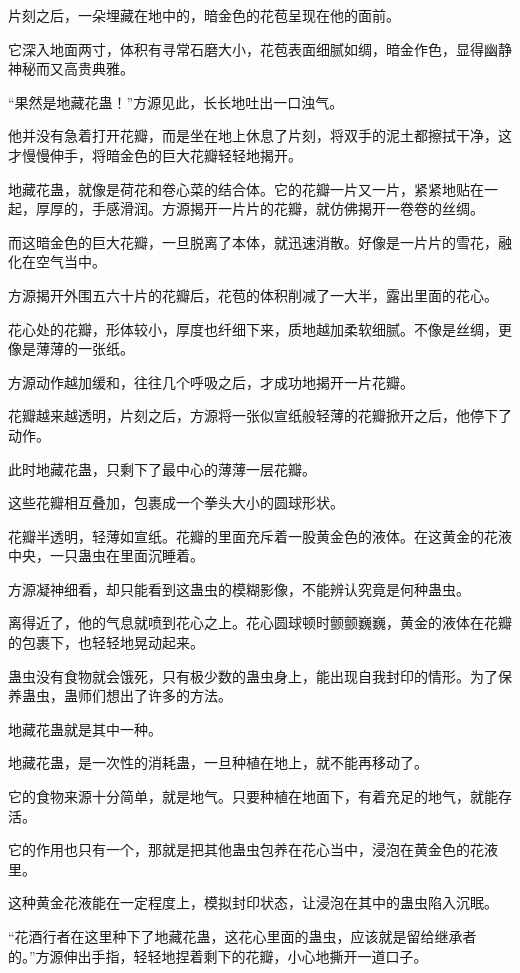 \begin{this_body}
片刻之后，一朵埋藏在地中的，暗金色的花苞呈现在他的面前。

它深入地面两寸，体积有寻常石磨大小，花苞表面细腻如绸，暗金作色，显得幽静神秘而又高贵典雅。

“果然是地藏花蛊！”方源见此，长长地吐出一口浊气。

他并没有急着打开花瓣，而是坐在地上休息了片刻，将双手的泥土都擦拭干净，这才慢慢伸手，将暗金色的巨大花瓣轻轻地揭开。

地藏花蛊，就像是荷花和卷心菜的结合体。它的花瓣一片又一片，紧紧地贴在一起，厚厚的，手感滑润。方源揭开一片片的花瓣，就仿佛揭开一卷卷的丝绸。

而这暗金色的巨大花瓣，一旦脱离了本体，就迅速消散。好像是一片片的雪花，融化在空气当中。

方源揭开外围五六十片的花瓣后，花苞的体积削减了一大半，露出里面的花心。

花心处的花瓣，形体较小，厚度也纤细下来，质地越加柔软细腻。不像是丝绸，更像是薄薄的一张纸。

方源动作越加缓和，往往几个呼吸之后，才成功地揭开一片花瓣。

花瓣越来越透明，片刻之后，方源将一张似宣纸般轻薄的花瓣掀开之后，他停下了动作。

此时地藏花蛊，只剩下了最中心的薄薄一层花瓣。

这些花瓣相互叠加，包裹成一个拳头大小的圆球形状。

花瓣半透明，轻薄如宣纸。花瓣的里面充斥着一股黄金色的液体。在这黄金的花液中央，一只蛊虫在里面沉睡着。

方源凝神细看，却只能看到这蛊虫的模糊影像，不能辨认究竟是何种蛊虫。

离得近了，他的气息就喷到花心之上。花心圆球顿时颤颤巍巍，黄金的液体在花瓣的包裹下，也轻轻地晃动起来。

蛊虫没有食物就会饿死，只有极少数的蛊虫身上，能出现自我封印的情形。为了保养蛊虫，蛊师们想出了许多的方法。

地藏花蛊就是其中一种。

地藏花蛊，是一次性的消耗蛊，一旦种植在地上，就不能再移动了。

它的食物来源十分简单，就是地气。只要种植在地面下，有着充足的地气，就能存活。

它的作用也只有一个，那就是把其他蛊虫包养在花心当中，浸泡在黄金色的花液里。

这种黄金花液能在一定程度上，模拟封印状态，让浸泡在其中的蛊虫陷入沉眠。

“花酒行者在这里种下了地藏花蛊，这花心里面的蛊虫，应该就是留给继承者的。”方源伸出手指，轻轻地捏着剩下的花瓣，小心地撕开一道口子。


\end{this_body}
